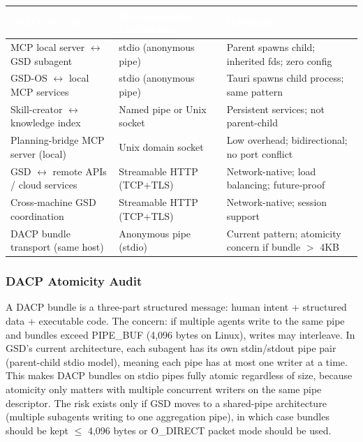 \documentclass[11pt,letterpaper]{article}
\newcommand{\tableheader}[1]{\textbf{\sffamily\textcolor{white}{#1}}}
\begin{document}
\begin{center}
\begin{tabularx}{\textwidth}{L{4.5cm}L{3.5cm}X}
\toprule
{}
\tableheader{GSD Use Case} & \tableheader{Recommended Mechanism} & \tableheader{Rationale} \\
\midrule
MCP local server $\leftrightarrow$ GSD subagent & stdio (anonymous pipe) & Parent spawns child; inherited fds; zero config \\
GSD-OS $\leftrightarrow$ local MCP services & stdio (anonymous pipe) & Tauri spawns child process; same pattern \\
Skill-creator $\leftrightarrow$ knowledge index & Named pipe or Unix socket & Persistent services; not parent-child \\
Planning-bridge MCP server (local) & Unix domain socket & Low overhead; bidirectional; no port conflict \\
GSD $\leftrightarrow$ remote APIs / cloud services & Streamable HTTP (TCP+TLS) & Network-native; load balancing; future-proof \\
Cross-machine GSD coordination & Streamable HTTP (TCP+TLS) & Network-native; session support \\
DACP bundle transport (same host) & Anonymous pipe (stdio) & Current pattern; atomicity concern if bundle $>$ 4KB \\
\bottomrule
\end{tabularx}
\end{center}

\subsubsection{DACP Atomicity Audit}

A DACP bundle is a three-part structured message: human intent + structured data + executable code. The concern: if multiple agents write to the same pipe and bundles exceed PIPE\_BUF (4,096 bytes on Linux), writes may interleave. In GSD's current architecture, each subagent has its own stdin/stdout pipe pair (parent-child stdio model), meaning each pipe has at most one writer at a time. This makes DACP bundles on stdio pipes fully atomic regardless of size, because atomicity only matters with multiple concurrent writers on the same pipe descriptor. The risk exists only if GSD moves to a shared-pipe architecture (multiple subagents writing to one aggregation pipe), in which case bundles should be kept $\leq$ 4,096 bytes or O\_DIRECT packet mode should be used.
\end{document}
